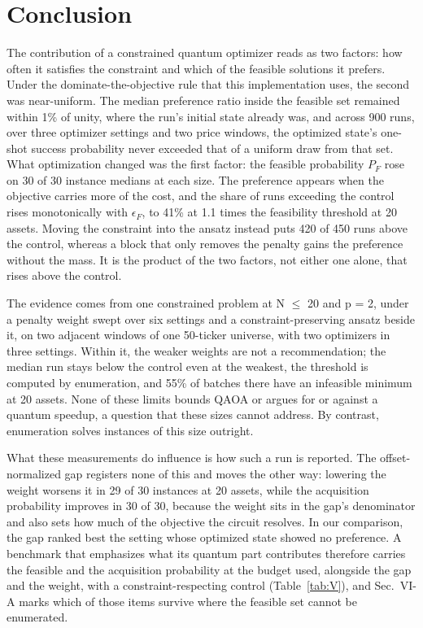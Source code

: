 \documentclass{ieeeaccess}
\begin{document}
\section{Conclusion}


The contribution of a constrained quantum optimizer reads as two factors: how often it satisfies the constraint and which of the feasible solutions it prefers. Under the dominate-the-objective rule that this implementation uses, the second was near-uniform. The median preference ratio inside the feasible set remained within 1\% of unity, where the run's initial state already was, and across 900 runs, over three optimizer settings and two price windows, the optimized state's one-shot success probability never exceeded that of a uniform draw from that set. What optimization changed was the first factor: the feasible probability $P_{F}$ rose on 30 of 30 instance medians at each size. The preference appears when the objective carries more of the cost, and the share of runs exceeding the control rises monotonically with $\epsilon_{F}$, to 41\% at 1.1 times the feasibility threshold at 20 assets. Moving the constraint into the ansatz instead puts 420 of 450 runs above the control, whereas a block that only removes the penalty gains the preference without the mass. It is the product of the two factors, not either one alone, that rises above the control.


The evidence comes from one constrained problem at N $\leq$ 20 and p = 2, under a penalty weight swept over six settings and a constraint-preserving ansatz beside it, on two adjacent windows of one 50-ticker universe, with two optimizers in three settings. Within it, the weaker weights are not a recommendation; the median run stays below the control even at the weakest, the threshold is computed by enumeration, and 55\% of batches there have an infeasible minimum at 20 assets. None of these limits bounds QAOA or argues for or against a quantum speedup, a question that these sizes cannot address. By contrast, enumeration solves instances of this size outright.


What these measurements do influence is how such a run is reported. The offset-normalized gap registers none of this and moves the other way: lowering the weight worsens it in 29 of 30 instances at 20 assets, while the acquisition probability improves in 30 of 30, because the weight sits in the gap's denominator and also sets how much of the objective the circuit resolves. In our comparison, the gap ranked best the setting whose optimized state showed no preference. A benchmark that emphasizes what its quantum part contributes therefore carries the feasible and the acquisition probability at the budget used, alongside the gap and the weight, with a constraint-respecting control (Table~\ref{tab:V}), and Sec.~VI-A marks which of those items survive where the feasible set cannot be enumerated.
\end{document}
